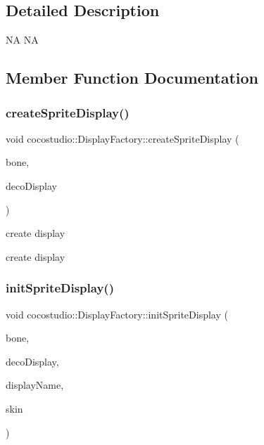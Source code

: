 \subsection{Detailed Description}
NA  NA 

\subsection{Member Function Documentation}
\mbox{\label{classcocostudio_1_1DisplayFactory_af37ea092eb4a2f9d6813a01f6a70b0c9}} 
\subsubsection{\texorpdfstring{create\+Sprite\+Display()}{createSpriteDisplay()}}
{\footnotesize\ttfamily void cocostudio\+::\+Display\+Factory\+::create\+Sprite\+Display (\begin{DoxyParamCaption}\item[{\hyperlink{classcocostudio_1_1Bone}{Bone} $\ast$}]{bone,  }\item[{\hyperlink{classcocostudio_1_1DecorativeDisplay}{Decorative\+Display} $\ast$}]{deco\+Display }\end{DoxyParamCaption})\hspace{0.3cm}{\ttfamily [static]}}

create display

create display \mbox{\label{classcocostudio_1_1DisplayFactory_a6dfe16535e3d027a1fe1c39cf3f860a9}} 
\subsubsection{\texorpdfstring{init\+Sprite\+Display()}{initSpriteDisplay()}}
{\footnotesize\ttfamily void cocostudio\+::\+Display\+Factory\+::init\+Sprite\+Display (\begin{DoxyParamCaption}\item[{\hyperlink{classcocostudio_1_1Bone}{Bone} $\ast$}]{bone,  }\item[{\hyperlink{classcocostudio_1_1DecorativeDisplay}{Decorative\+Display} $\ast$}]{deco\+Display,  }\item[{const char $\ast$}]{display\+Name,  }\item[{\hyperlink{classcocostudio_1_1Skin}{Skin} $\ast$}]{skin }\end{DoxyParamCaption})\hspace{0.3cm}{\ttfamily [static]}}

